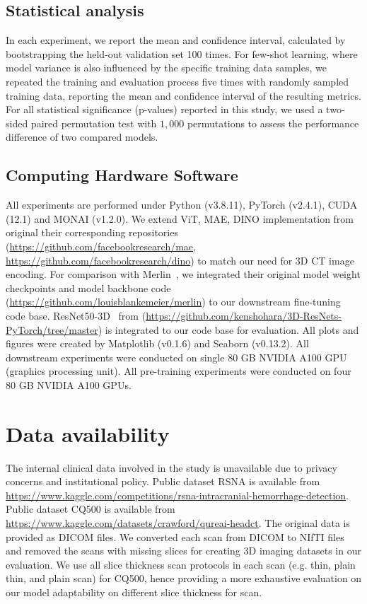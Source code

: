 \documentclass[fleqn,10pt]{wlscirep}
\begin{document}
\subsection*{Statistical analysis}

In each experiment, we report the mean and confidence interval, calculated by bootstrapping the held-out validation set 100 times. For few-shot learning, where model variance is also influenced by the specific training data samples, we repeated the training and evaluation process five times with randomly sampled training data, reporting the mean and confidence interval of the resulting metrics. For all statistical significance (p-values) reported in this study, we used a two-sided paired permutation test with $1,000$ permutations to assess the performance difference of two compared models.

\subsection*{Computing Hardware Software}
All experiments are performed under Python (v3.8.11), PyTorch (v2.4.1), CUDA (12.1) and MONAI (v1.2.0). We extend ViT, MAE, DINO implementation from original their corresponding repositories (\url{https://github.com/facebookresearch/mae}, \url{https://github.com/facebookresearch/dino}) to match our need for 3D CT image encoding. For comparison with Merlin~\cite{blankemeier2024merlinvisionlanguagefoundation}, we integrated their original model weight checkpoints and model backbone code (\url{https://github.com/louisblankemeier/merlin}) to our downstream fine-tuning code base. ResNet50-3D~\cite{hara3dcnns} from (\url{https://github.com/kenshohara/3D-ResNets-PyTorch/tree/master}) is integrated to our code base for evaluation. All plots and figures were created by Matplotlib (v0.1.6) and Seaborn (v0.13.2). All downstream experiments were conducted on single 80 GB NVIDIA A100 GPU (graphics processing unit). All pre-training experiments were conducted on four 80 GB NVIDIA A100 GPUs.




\section*{Data availability}
The internal clinical data involved in the study is unavailable due to privacy concerns and institutional policy. Public dataset RSNA is available from \url{https://www.kaggle.com/competitions/rsna-intracranial-hemorrhage-detection}. Public dataset CQ500 is available from \url{https://www.kaggle.com/datasets/crawford/qureai-headct}.  The original data is provided as DICOM files. We converted each scan from DICOM to NIfTI files and removed the scans with missing slices for creating 3D imaging datasets in our evaluation. We use all slice thickness scan protocols in each scan (e.g. thin, plain thin, and plain scan) for CQ500, hence providing a more exhaustive evaluation on our model adaptability on different slice thickness for scan.
\end{document}
